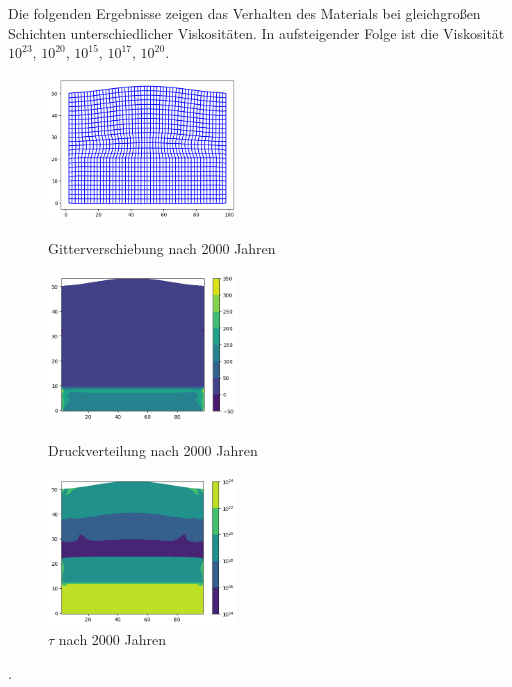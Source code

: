 \documentclass[12pt]{article}
\begin{document}
Die folgenden Ergebnisse zeigen das Verhalten des Materials bei gleichgroßen Schichten unterschiedlicher Viskositäten. In aufsteigender Folge ist die Viskosität $10^{23}$, $10^{20}$, $10^{15}$, $10^{17}$, $10^{20}$.
\begin{figure}[H]
	\begin{minipage}[hbt]{0.25\textwidth}
		\centering
		\includegraphics[width=5cm]{A2_Gitterverschiebung_2000.png}
		\caption{Gitterverschiebung nach 2000 Jahren}
		\label{Bild1}
	\end{minipage}
	\hfill
	\begin{minipage}[hbt]{0.25\textwidth}
		\centering
		\includegraphics[width=5cm]{A2_Druck_2000.png}
		\caption{Druckverteilung nach 2000 Jahren}
		\label{Bild2}
	\end{minipage}
	\hfill
	\begin{minipage}[hbt]{0.25\textwidth}
		\centering
		\includegraphics[width=5cm]{A2_tau2nd_2000.png}
		\caption{$\tau$ nach 2000 Jahren}
		\label{Bild2}
	\end{minipage}
\end{figure}
.
\end{document}
